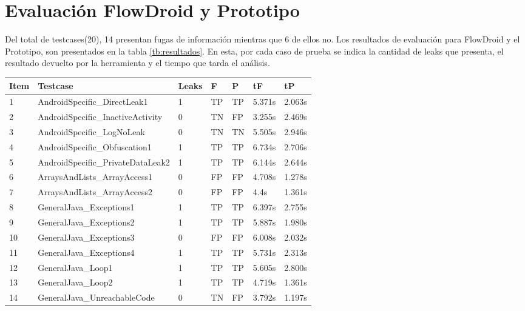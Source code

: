 \section{Evaluación FlowDroid y Prototipo } 
\label{subsec:fvsp}
Del total de testcases(20), 14 presentan fugas de información mientras que 6 de
ellos no. Los resultados de evaluación para FlowDroid y el Prototipo, son
presentados en la tabla \ref{tb:resultados}. En esta, por cada caso de prueba
se indica la cantidad de leaks que presenta, el resultado devuelto por la
herramienta y el tiempo que tarda el análisis.

\begin{table}[H]
\begin{center}
\small\addtolength{\tabcolsep}{-3pt}
\begin{tabular}{|p{1cm}|p{6cm}|p{1cm}|p{1cm}|p{1cm}|p{1cm}|p{1cm}|}
	\hline
	\textbf{Item} & \textbf{Testcase} & \textbf{Leaks} & \textbf{F} &
	\textbf{P} & \textbf{ tF} & 
	\textbf{tP}\\
	\hline
	1 & AndroidSpecific\_DirectLeak1 & 1 & TP & TP &5.371s &2.063s\\
	\hline
	2 & AndroidSpecific\_InactiveActivity & 0 & TN & FP  &3.255s &2.469s\\
	\hline
	3 & AndroidSpecific\_LogNoLeak & 0 & TN & TN &5.505s &2.946s\\
	\hline
	4 & AndroidSpecific\_Obfuscation1 & 1 & TP & TP &6.734s &2.706s\\
	\hline
	5 & AndroidSpecific\_PrivateDataLeak2 & 1 & TP & TP & 6.144s &2.644s\\
	\hline
	6 & ArraysAndLists\_ArrayAccess1 & 0 & FP & FP & 4.708s & 1.278s\\
	\hline
	7 & ArraysAndLists\_ArrayAccess2 & 0 & FP & FP & 4.4s &1.361s\\
	 \hline
	8 & GeneralJava\_Exceptions1 & 1 & TP & TP &6.397s &2.755s\\
	\hline
	9 &  GeneralJava\_Exceptions2 & 1 & TP & TP &5.887s &1.980s\\
	\hline
	10 & GeneralJava\_Exceptions3 & 0 & FP & FP &6.008s &2.032s\\
	\hline
	11 & GeneralJava\_Exceptions4 & 1 & TP & TP &5.731s &2.313s\\
	\hline
	12 & GeneralJava\_Loop1 & 1 & TP & TP &5.605s &2.800s\\
	\hline
	13 & GeneralJava\_Loop2 & 1 & TP & TP &4.719s &1.361s\\
	\hline
	14 & GeneralJava\_UnreachableCode & 0 & TN & FP &3.792s &1.197s\\

\end{tabular}
\end{center}
\end{table}
